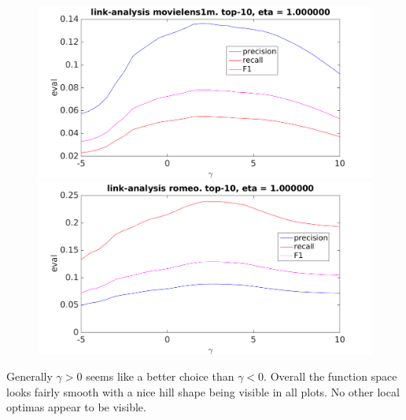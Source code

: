 \begin{figure}[h!]
\centering
\begin{minipage}{.5\textwidth}
    \centering
    \includegraphics[width=\linewidth]{fig/link_gamma/movielens_link_gamma.png}
\end{minipage}%
\begin{minipage}{.5\textwidth}
    \centering
    \includegraphics[width=\linewidth]{fig/link_gamma/romeo_link_gamma.png}
\end{minipage}
\end{figure}

\FloatBarrier

Generally $\gamma > 0$ seems like a better choice than $\gamma < 0$. Overall the function space looks fairly smooth with a nice hill shape being visible in all plots. No other local optimas appear to be visible.

